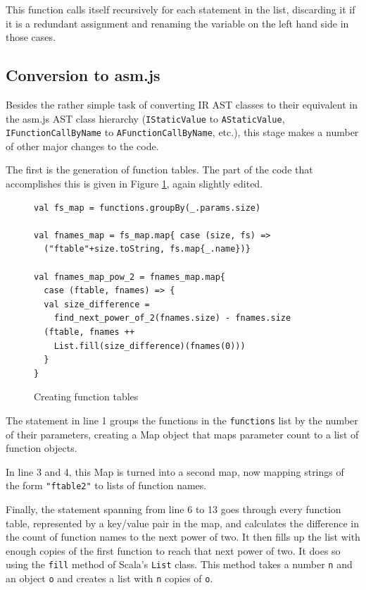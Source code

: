 \documentclass[11pt]{report}
\begin{document}
This function calls itself recursively for each statement in the list, discarding it if it is a redundant assignment and renaming the variable on the left hand side in those cases.

\subsection{Conversion to asm.js}
Besides the rather simple task of converting IR AST classes to their equivalent in the asm.js AST class hierarchy (\texttt{IStaticValue} to \texttt{AStaticValue}, \texttt{IFunctionCallByName} to \texttt{AFunctionCallByName}, etc.), this stage makes a number of other major changes to the code.

The first is the generation of function tables. The part of the code that accomplishes this is given in Figure \ref{iconvasmjs1}, again slightly edited.

\begin{figure}[ht]
\begin{lstlisting}
val fs_map = functions.groupBy(_.params.size)

val fnames_map = fs_map.map{ case (size, fs) => 
  ("ftable"+size.toString, fs.map{_.name})}
  
val fnames_map_pow_2 = fnames_map.map{ 
  case (ftable, fnames) => {
  val size_difference = 
    find_next_power_of_2(fnames.size) - fnames.size
  (ftable, fnames ++ 
    List.fill(size_difference)(fnames(0)))
  }
}
\end{lstlisting}
\caption{Creating function tables}
\label{iconvasmjs1}
\end{figure}

The statement in line 1 groups the functions in the \texttt{functions} list by the number of their parameters, creating a Map object that maps parameter count to a list of function objects.

In line 3 and 4, this Map is turned into a second map, now mapping strings of the form \texttt{"ftable2"} to lists of function names.

Finally, the statement spanning from line 6 to 13 goes through every function table, represented by a key/value pair in the map, and calculates the difference in the count of function names to the next power of two. It then fills up the list with enough copies of the first function to reach that next power of two. It does so using the \texttt{fill} method of Scala's \texttt{List} class. This method takes a number \texttt{n} and an object \texttt{o} and creates a list with \texttt{n} copies of \texttt{o}.
\end{document}
